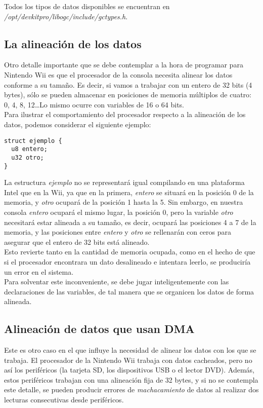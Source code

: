 Todos los tipos de datos disponibles se encuentran en \emph{/opt/devkitpro/libogc/include/gctypes.h}.

\subsection{La alineación de los datos}

Otro detalle importante que se debe contemplar a la hora de programar para Nintendo Wii es que el procesador de la consola necesita alinear los datos conforme a su tamaño. Es decir, si vamos a trabajar con un entero de 32 bits (4 bytes), sólo se pueden almacenar en posiciones de memoria múltiplos de cuatro: 0, 4, 8, 12\ldots Lo mismo ocurre con variables de 16 o 64 bits. \\

Para ilustrar el comportamiento del procesador respecto a la alineación de los datos, podemos considerar el siguiente ejemplo:

\begin{lstlisting}[style=C++]
struct ejemplo {
  u8 entero;
  u32 otro;
}
\end{lstlisting}

La estructura \emph{ejemplo} no se representará igual compilando en una plataforma Intel que en la Wii, ya que en la primera, \emph{entero} se situará en la posición 0 de la memoria, y \emph{otro} ocupará de la posición 1 hasta la 5. Sin embargo, en nuestra consola \emph{entero} ocupará el mismo lugar, la posición 0, pero la variable \emph{otro} necesitará estar alineada a su tamaño, es decir, ocupará las posiciones 4 a 7 de la memoria, y las posiciones entre \emph{entero} y \emph{otro} se rellenarán con ceros para asegurar que el entero de 32 bits está alineado. \\

Esto revierte tanto en la cantidad de memoria ocupada, como en el hecho de que si el procesador encontrara un dato desalineado e intentara leerlo, se produciría un error en el sistema. \\

Para solventar este inconveniente, se debe jugar inteligentemente con las declaraciones de las variables, de tal manera que se organicen los datos de forma alineada.

\subsection{Alineación de datos que usan DMA}

Este es otro caso en el que influye la necesidad de alinear los datos con los que se trabaja. El procesador de la Nintendo Wii trabaja con datos cacheados, pero no así los periféricos (la tarjeta SD, los dispositivos USB o el lector DVD). Además, estos periféricos trabajan con una alineación fija de 32 bytes, y si no se contempla este detalle, se pueden producir errores de \emph{machacamiento} de datos al realizar dos lecturas consecutivas desde periféricos. \\

